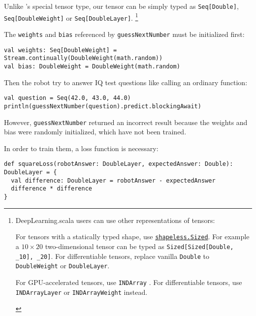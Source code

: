 Unlike \cite{chen2017typesafe}'s special tensor type, our tensor can be simply typed as \lstinline{Seq[Double]}, \lstinline{Seq[DoubleWeight]} or \lstinline{Seq[DoubleLayer]}.
\footnote{DeepLearning.scala users can use other representations of tensors:
\begin{enumerate*}
  \item For tensors with a statically typed shape, use \href{https://javadoc.io/page/com.chuusai/shapeless_2.11/latest/shapeless/Sized.html}{ \lstinline{shapeless.Sized}}. For example a $10\times20$ two-dimensional tensor can be typed as \lstinline{Sized[Sized[Double, _10], _20]}. For differentiable tensors, replace vanilla \lstinline{Double} to \lstinline{DoubleWeight} or \lstinline{DoubleLayer}.
  \item For GPU-accelerated tensors, use \lstinline{INDArray} \cite{skymind2017nd4j}. For differentiable tensors, use \lstinline{INDArrayLayer} or \lstinline{INDArrayWeight} instead.
\end{enumerate*}
}

The \lstinline{weights} and \lstinline{bias} referenced by \lstinline{guessNextNumber} must be initialized first:

\begin{lstlisting}[float={h t b p},caption={Weight initialization}]
val weights: Seq[DoubleWeight] = Stream.continually(DoubleWeight(math.random))
val bias: DoubleWeight = DoubleWeight(math.random)
\end{lstlisting}

Then the robot try to answer IQ test questions like calling an ordinary function:

\begin{lstlisting}[float={h t b p},caption={Inference on an untrained model}]
val question = Seq(42.0, 43.0, 44.0)
println(guessNextNumber(question).predict.blockingAwait)
\end{lstlisting}

However, \lstinline{guessNextNumber} returned an incorrect result because the weights and bias were randomly initialized, which have not been trained.

In order to train them, a loss function is necessary:

\begin{lstlisting}[float={h t b p},caption={The differentiable square loss function},label={squareLoss}]
def squareLoss(robotAnswer: DoubleLayer, expectedAnswer: Double): DoubleLayer = {
  val difference: DoubleLayer = robotAnswer - expectedAnswer
  difference * difference
}
\end{lstlisting}

